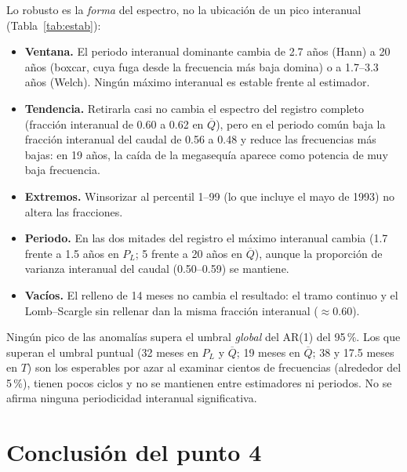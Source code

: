 \documentclass[11pt,letterpaper]{article}
\begin{document}
Lo robusto es la \emph{forma} del espectro, no la ubicación de un pico interanual (Tabla~\ref{tab:estab}):
\begin{itemize}
\item \textbf{Ventana.} El periodo interanual dominante cambia de 2.7 años (Hann) a 20 años (boxcar, cuya fuga
desde la frecuencia más baja domina) o a 1.7--3.3 años (Welch). Ningún máximo interanual es estable frente al
estimador.
\item \textbf{Tendencia.} Retirarla casi no cambia el espectro del registro completo (fracción interanual de
0.60 a 0.62 en $\overline{Q}$), pero en el periodo común baja la fracción interanual del caudal de 0.56 a 0.48 y
reduce las frecuencias más bajas: en 19 años, la caída de la megasequía aparece como potencia de muy baja
frecuencia.
\item \textbf{Extremos.} Winsorizar al percentil 1--99 (lo que incluye el mayo de 1993) no altera las fracciones.
\item \textbf{Periodo.} En las dos mitades del registro el máximo interanual cambia (1.7 frente a 1.5 años en
$P_L$; 5 frente a 20 años en $\overline{Q}$), aunque la proporción de varianza interanual del caudal (0.50--0.59)
se mantiene.
\item \textbf{Vacíos.} El relleno de 14 meses no cambia el resultado: el tramo continuo y el Lomb--Scargle sin
rellenar dan la misma fracción interanual ($\approx0.60$).
\end{itemize}
Ningún pico de las anomalías supera el umbral \emph{global} del AR(1) del 95\,\%. Los que superan el umbral
puntual (32 meses en $P_L$ y $\overline{Q}$; 19 meses en $\overline{Q}$; 38 y 17.5 meses en $T$) son los esperables por
azar al examinar cientos de frecuencias (alrededor del 5\,\%), tienen pocos ciclos y no se mantienen entre
estimadores ni periodos. No se afirma ninguna periodicidad interanual significativa.

\section*{Conclusión del punto 4}
\end{document}
